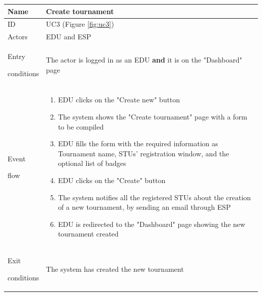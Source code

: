 \begin{center}
    \def\arraystretch{1.5}
    \begin{tabular}{| m{2cm} | m{10cm}|}
        \hline
        Name                  & Create tournament                                                                                                                               \\ \hline
        ID                    & UC3 (Figure \ref{fig:uc3})                                                                                                                      \\ \hline
        Actors                & EDU and ESP                                                                                                                                     \\ \hline
        Entry \par conditions & The actor is logged in as an EDU \textbf{and} it is on the "Dashboard" page                                                                    \\ \hline
        Event \par flow       & \begin{enumerate}
                                    \item EDU clicks on the "Create new" button
                                    \item The system shows the "Create tournament" page with a form to be compiled
                                    \item EDU fills the form with the required information as Tournament name, STUs' registration window, and the optional list of badges
                                    \item EDU clicks on the "Create" button
                                    \item The system notifies all the registered STUs about the creation of a new tournament, by sending an email through ESP
                                    \item EDU is redirected to the "Dashboard" page showing the new tournament created
                                \end{enumerate}                                                                                                                                 \\ \hline
        Exit \par conditions  & The system has created the new tournament                                                                                                      \\ \hline

\end{tabular}
\end{center}
